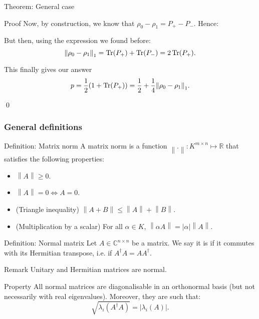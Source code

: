 \documentclass[a4paper]{article}
\begin{document}
\begin{parag}{Theorem: General case}
\begin{subparag}{Proof}
        Now, by construction, we know that $\rho_0 - \rho_1= P_+ - P_-$. Hence:  
        
        But then, using the expression we found before:
        \[\left\|\rho_0 - \rho_1\right\|_1 = \Tr\left(P_+\right) + \Tr\left(P_-\right) = 2\Tr\left(P_+\right).\]

        This finally gives our answer 
        \[p = \frac{1}{2}\left(1 + \Tr\left(P_+\right)\right) = \frac{1}{2} + \frac{1}{4} \left\|\rho_0 - \rho_1\right\|_1.\]
        
        \qed
    \end{subparag}
\end{parag}

\subsubsection{General definitions}

\begin{parag}{Definition: Matrix norm}
    A matrix norm is a function $\left\|.\right\|: K^{m \times n} \mapsto \mathbb{R}$ that satisfies the following properties:
    \begin{itemize}
        \item $\left\|A\right\| \geq 0$.
        \item $\left\|A\right\| = 0 \iff A = 0$.
        \item (Triangle inequality) $\left\|A + B\right\| \leq \left\|A\right\| + \left\|B\right\|.$
        \item (Multiplication by a scalar) For all $\alpha \in K$, $\left\|\alpha A\right\| = \left|\alpha\right| \left\|A\right\|$.
    \end{itemize}
     
\end{parag}

\begin{parag}{Definition: Normal matrix}
    Let $A \in \mathbb{C}^{n \times n}$ be a matrix. We say it is  if it commutes with its Hermitian transpose, i.e. if $A^{\dagger} A = A A ^{\dagger}$.
     
    \begin{subparag}{Remark}
        Unitary and Hermitian matrices are normal.
    \end{subparag}

    \begin{subparag}{Property}
        All normal matrices are diagonalisable in an orthonormal basis (but not necessarily with real eigenvalues). Moreover, they are such that:  
        \[\sqrt{\lambda_i\left(A^{\dagger} A\right)} = \left|\lambda_i\left(A\right)\right|.\]
    \end{subparag}
\end{parag}
\end{document}
